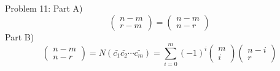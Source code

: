 \documentclass{article}
\begin{document}
Problem 11: Part A)
$$
\left(\begin{array}{c}
n-m\\
r-m
\end{array}\right)
=
\left(\begin{array}{c}
n-m\\
n-r
\end{array}\right)
$$
Part B)
$$
\left(\begin{array}{c}
n-m\\
n-r
\end{array}\right)
=
N(\bar{c_1}\bar{c_2}\cdots\bar{c_m})
=
\sum_{i=0}^{m}
(-1)^i
\left(\begin{array}{c}
m\\
i
\end{array}\right)
\left(\begin{array}{c}
n-i\\
r
\end{array}\right)
$$
\end{document}

